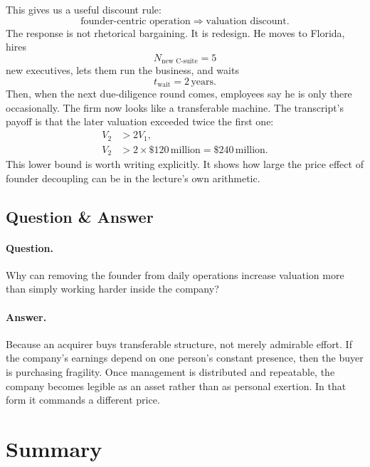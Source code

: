 This gives us a useful discount rule:
\begin{equation}
\text{founder-centric operation}\Rightarrow \text{valuation discount}.
\end{equation}
The response is not rhetorical bargaining. It is redesign. He moves to Florida, hires
\begin{equation}
N_{\text{new C-suite}} = 5
\end{equation}
new executives, lets them run the business, and waits
\begin{equation}
t_{\text{wait}} = 2\,\text{years}.
\end{equation}
Then, when the next due-diligence round comes, employees say he is only there occasionally. The firm now looks like a transferable machine. The transcript's payoff is that the later valuation exceeded twice the first one:
\begin{align}
V_2 &> 2V_1,\\
V_2 &> 2 \times \$120\,\text{million} = \$240\,\text{million}.
\end{align}
This lower bound is worth writing explicitly. It shows how large the price effect of founder decoupling can be in the lecture's own arithmetic.

\subsection{Question \& Answer}

\paragraph{Question.} Why can removing the founder from daily operations increase valuation more than simply working harder inside the company?

\paragraph{Answer.} Because an acquirer buys transferable structure, not merely admirable effort. If the company's earnings depend on one person's constant presence, then the buyer is purchasing fragility. Once management is distributed and repeatable, the company becomes legible as an asset rather than as personal exertion. In that form it commands a different price.

\section{Summary}

